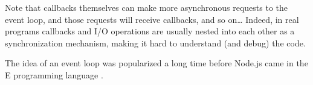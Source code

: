 Note that callbacks themselves can make more asynchronous requests to the event loop, and those requests will receive callbacks, and so on\dots{}
Indeed, in real programs callbacks and I/O operations are usually nested into each other as a synchronization mechanism, making it hard to understand (and debug) the code.

The idea of an event loop was popularized a long time before Node.js came in the E programming language \cite{eventloop}.

